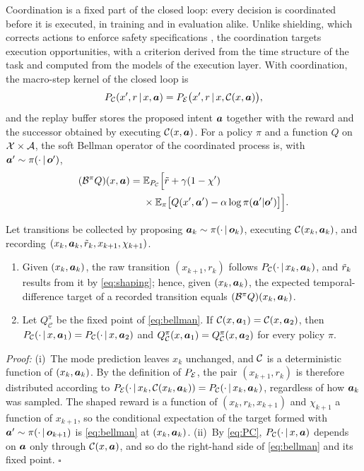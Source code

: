 Coordination is a fixed part of the closed loop: every decision is coordinated before it is executed, in training and in evaluation alike. Unlike shielding, which corrects actions to enforce safety specifications \cite{alshiekh2018shielding}, the coordination targets execution opportunities, with a criterion derived from the time structure of the task and computed from the models of the execution layer. With coordination, the macro-step kernel of the closed loop is
\begin{equation}\label{eq:PC}
P_{\mathcal{C}}(x',r\,|\,x,\boldsymbol{a})=P_{\mathcal{E}}\bigl(x',r\,|\,x,\mathcal{C}(x,\boldsymbol{a})\bigr),
\end{equation}
and the replay buffer stores the proposed intent $\boldsymbol{a}$ together with the reward and the successor obtained by executing $\mathcal{C}(x,\boldsymbol{a})$. For a policy $\pi$ and a function $Q$ on $\mathcal{X}\times\mathcal{A}$, the soft Bellman operator of the coordinated process is, with $\boldsymbol{a}'\sim\pi(\cdot\,|\,\boldsymbol{o}')$,
\begin{equation}\label{eq:bellman}
\begin{aligned}
(\mathcal{B}^{\pi}Q)(x,\boldsymbol{a})={}&\mathbb{E}_{P_{\mathcal{C}}}\Bigl[\tilde{r}+\gamma(1-\chi')\\
&\times\mathbb{E}_{\pi}\bigl[Q(x',\boldsymbol{a}')-\alpha\log\pi(\boldsymbol{a}'|\boldsymbol{o}')\bigr]\Bigr].
\end{aligned}
\end{equation}

\begin{proposition}\label{prop:screen}
Let transitions be collected by proposing $\boldsymbol{a}_{k}\sim\pi(\cdot\,|\,\boldsymbol{o}_{k})$, executing $\mathcal{C}(x_{k},\boldsymbol{a}_{k})$, and recording $(x_{k},\boldsymbol{a}_{k},\tilde{r}_{k},x_{k+1},\chi_{k+1})$.
\begin{enumerate}
\item[(i)] Given $(x_{k},\boldsymbol{a}_{k})$, the raw transition $(x_{k+1},r_{k})$ follows $P_{\mathcal{C}}(\cdot\,|\,x_{k},\boldsymbol{a}_{k})$, and $\tilde{r}_{k}$ results from it by \eqref{eq:shaping}; hence, given $(x_{k},\boldsymbol{a}_{k})$, the expected temporal-difference target of a recorded transition equals $(\mathcal{B}^{\pi}Q)(x_{k},\boldsymbol{a}_{k})$.
\item[(ii)] Let $Q^{\pi}_{\mathcal{C}}$ be the fixed point of \eqref{eq:bellman}. If $\mathcal{C}(x,\boldsymbol{a}_{1})=\mathcal{C}(x,\boldsymbol{a}_{2})$, then $P_{\mathcal{C}}(\cdot\,|\,x,\boldsymbol{a}_{1})=P_{\mathcal{C}}(\cdot\,|\,x,\boldsymbol{a}_{2})$ and $Q^{\pi}_{\mathcal{C}}(x,\boldsymbol{a}_{1})=Q^{\pi}_{\mathcal{C}}(x,\boldsymbol{a}_{2})$ for every policy $\pi$.
\end{enumerate}
\end{proposition}

\textit{Proof:} (i)~The mode prediction leaves $x_{k}$ unchanged, and $\mathcal{C}$ is a deterministic function of $(x_{k},\boldsymbol{a}_{k})$. By the definition of $P_{\mathcal{E}}$, the pair $(x_{k+1},r_{k})$ is therefore distributed according to $P_{\mathcal{E}}(\cdot\,|\,x_{k},\mathcal{C}(x_{k},\boldsymbol{a}_{k}))=P_{\mathcal{C}}(\cdot\,|\,x_{k},\boldsymbol{a}_{k})$, regardless of how $\boldsymbol{a}_{k}$ was sampled. The shaped reward is a function of $(x_{k},r_{k},x_{k+1})$ and $\chi_{k+1}$ a function of $x_{k+1}$, so the conditional expectation of the target formed with $\boldsymbol{a}'\sim\pi(\cdot\,|\,\boldsymbol{o}_{k+1})$ is \eqref{eq:bellman} at $(x_{k},\boldsymbol{a}_{k})$. (ii)~By \eqref{eq:PC}, $P_{\mathcal{C}}(\cdot\,|\,x,\boldsymbol{a})$ depends on $\boldsymbol{a}$ only through $\mathcal{C}(x,\boldsymbol{a})$, and so do the right-hand side of \eqref{eq:bellman} and its fixed point. \hfill$\square$

